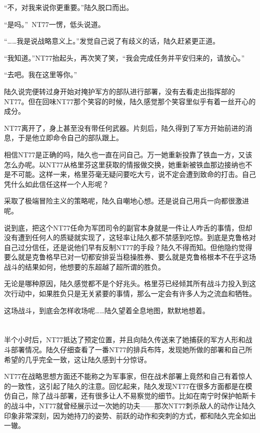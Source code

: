“不，对我来说你更重要。”陆久脱口而出。

“是吗。” NT77一愣，低头说道。

“……我是说战略意义上。”发觉自己说了有歧义的话，陆久赶紧更正道。

“我知道。”NT77抬起头，再次笑了笑，“我会完成任务并平安归来的，请放心。”

“去吧。我在这里等你。”

陆久说完便转过身开始对掩护军方的部队进行部署，没有去看走出指挥部的NT77。但在回味NT77那个笑容的时候，陆久感觉那个笑容里似乎有着一丝开心的成分。

NT77离开了，身上甚至没有带任何武器。片刻后，陆久得到了军方开始前进的消息，于是他立即命令自己的部队跟上。

相信NT77是正确的吗，陆久也一直在问自己。万一她重新投靠了铁血一方，又该怎么办呢。以NT77从格里芬这里获取的情报做交换，她重新被铁血那边接纳也不是不可能。这样一来，格里芬毫无疑问要吃大亏，说不定会遭到致命的打击。自己凭什么如此信任这样一个人形呢？

采取了极端冒险主义的策略呢，陆久自嘲地心想。还是说自己用兵一向都很激进呢。

说到底，把这个NT77任命为军团司令的副官本身就是一件让人咋舌的事情，但却没有遭到任何人的质疑就实现了，这轻率让陆久都不禁感到吃惊。到底是克鲁格对自己过分信任，还是说他们早有反制NT77的手段？陆久不得而知。但他隐约觉得要么就是克鲁格早已对一切都安排妥当稳操胜券、要么就是克鲁格根本不在乎这场战斗的结果如何，他想要的东超越了超所谓的胜负。

无论是哪种原因，陆久感觉都不是个好兆头。格里芬已经倾其所有战斗力投入到这次行动中，如果胜负只是无关紧要的事情，那么一定会有许多人为之流血和牺牲。

这场战斗，到底会怎样收场呢……陆久望着全息地图，默默地想着。

\section*{}

半个小时后，NT77抵达了预定位置，并且向陆久传送来了她捕获的军方人形和战斗部署情况。陆久仔细查看了一番NT77的排兵布阵，发现她所做的部署和自己所希望的几乎完全一致，这让陆久感到十分惊讶。

NT77在战略思想方面还不能称之为军事家，但在战术部署上竟然和自己有着惊人的一致性，这引起了陆久的注意。回忆起来，陆久发现NT77在很多方面都是在模仿自己，除了战斗部署，还有很多让人不易察觉的细节。比如在南宁时保护帕斯卡的战斗中，NT77就曾经展示过一次她的功夫——那次NT77刺杀敌人的动作让陆久印象非常深刻，因为她持刀的姿势、前跃的动作和突刺的方式，都和陆久完全如出一辙。

